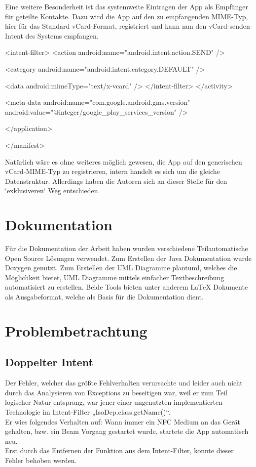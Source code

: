 \documentclass[a4paper,ngerman,12pt]{report}
\begin{document}
Eine weitere Besonderheit ist das systemweite Eintragen der App als Empfänger für geteilte Kontakte. Dazu wird die App auf den zu empfangenden MIME-Typ, hier für das Standard vCard-Format, registriert und kann nun den vCard-senden-Intent des Systems empfangen.

\begin{DoxyVerb}            <intent-filter>
                <action android:name="android.intent.action.SEND" />

                <category android:name="android.intent.category.DEFAULT" />

                <data android:mimeType="text/x-vcard" />
            </intent-filter>
        </activity>

        <meta-data
            android:name="com.google.android.gms.version"
            android:value="@integer/google_play_services_version" />

    </application>

</manifest>
\end{DoxyVerb}


Natürlich wäre es ohne weiteres möglich gewesen, die App auf den generischen vCard-MIME-Typ zu registrieren, intern handelt es sich um die gleiche Datenstruktur. Allerdings haben die Autoren sich an dieser Stelle für den \char`\"{}exklusiveren\char`\"{} Weg entschieden.

\section{Dokumentation}

Für die Dokumentation der Arbeit haben wurden verschiedene Teilautomatische Open Source Lösungen verwendet. Zum Erstellen der Java Dokumentation wurde Doxygen genutzt. Zum Erstellen der UML Diagramme plantuml, welches die Möglichkeit bietet, UML Diagramme mittels einfacher Textbeschreibung automatisiert zu erstellen. Beide Tools bieten unter anderem LaTeX Dokumente als Ausgabeformat, welche als Basis für die Dokumentation dient.

\section{Problembetrachtung}

\subsection*{Doppelter Intent}

Der Fehler, welcher das größte Fehlverhalten verursachte und leider auch nicht durch das Analysieren von Exceptions zu beseitigen war, weil er zum Teil logischer Natur entsprang, war jener einer ungenutzten implementierten Technologie im Intent-Filter „IsoDep.class.getName()“. \\
Er wies folgendes Verhalten auf: Wann immer ein NFC Medium an das Gerät gehalten, bzw. ein Beam Vorgang gestartet wurde, startete die App automatisch neu. \\
Erst durch das Entfernen der Funktion aus dem Intent-Filter, konnte dieser Fehler behoben werden.
\end{document}
